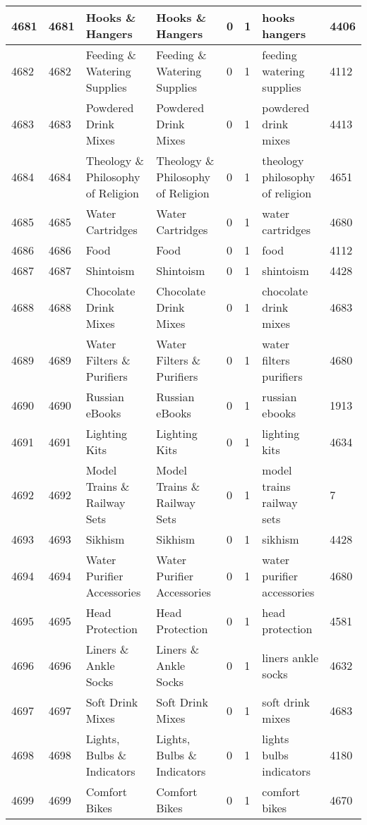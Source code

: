 \begin{longtable}{|l|l|l|l|l|l|l|l|}
4681 & 4681 & Hooks \& Hangers & Hooks \& Hangers & 0 & 1 & hooks hangers & 4406 \\ \hline 
4682 & 4682 & Feeding \& Watering Supplies & Feeding \& Watering Supplies & 0 & 1 & feeding watering supplies & 4112 \\ \hline 
4683 & 4683 & Powdered Drink Mixes & Powdered Drink Mixes & 0 & 1 & powdered drink mixes & 4413 \\ \hline 
4684 & 4684 & Theology \& Philosophy of Religion & Theology \& Philosophy of Religion & 0 & 1 & theology philosophy of religion & 4651 \\ \hline 
4685 & 4685 & Water Cartridges & Water Cartridges & 0 & 1 & water cartridges & 4680 \\ \hline 
4686 & 4686 & Food & Food & 0 & 1 & food & 4112 \\ \hline 
4687 & 4687 & Shintoism & Shintoism & 0 & 1 & shintoism & 4428 \\ \hline 
4688 & 4688 & Chocolate Drink Mixes & Chocolate Drink Mixes & 0 & 1 & chocolate drink mixes & 4683 \\ \hline 
4689 & 4689 & Water Filters \& Purifiers & Water Filters \& Purifiers & 0 & 1 & water filters purifiers & 4680 \\ \hline 
4690 & 4690 & Russian eBooks & Russian eBooks & 0 & 1 & russian ebooks & 1913 \\ \hline 
4691 & 4691 & Lighting Kits & Lighting Kits & 0 & 1 & lighting kits & 4634 \\ \hline 
4692 & 4692 & Model Trains \& Railway Sets & Model Trains \& Railway Sets & 0 & 1 & model trains railway sets & 7 \\ \hline 
4693 & 4693 & Sikhism & Sikhism & 0 & 1 & sikhism & 4428 \\ \hline 
4694 & 4694 & Water Purifier Accessories & Water Purifier Accessories & 0 & 1 & water purifier accessories & 4680 \\ \hline 
4695 & 4695 & Head Protection & Head Protection & 0 & 1 & head protection & 4581 \\ \hline 
4696 & 4696 & Liners \& Ankle Socks & Liners \& Ankle Socks & 0 & 1 & liners ankle socks & 4632 \\ \hline 
4697 & 4697 & Soft Drink Mixes & Soft Drink Mixes & 0 & 1 & soft drink mixes & 4683 \\ \hline 
4698 & 4698 & Lights, Bulbs \& Indicators & Lights, Bulbs \& Indicators & 0 & 1 & lights bulbs indicators & 4180 \\ \hline 
4699 & 4699 & Comfort Bikes & Comfort Bikes & 0 & 1 & comfort bikes & 4670 \\ \hline 

\end{longtable}
